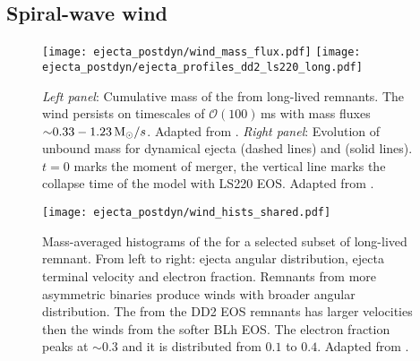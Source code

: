 \subsection{Spiral-wave wind} \label{sec:bns_sims:sww}

\begin{figure}[t]
    \centering 
    \texttt{[image: ejecta\_postdyn/wind\_mass\_flux.pdf]}
    \texttt{[image: ejecta\_postdyn/ejecta\_profiles\_dd2\_ls220\_long.pdf]}
    \caption{
        \emph{Left panel}:
        Cumulative mass of the \swind{} from long-lived
        remnants. The wind persists on timescales of $\mathcal{O}(100)\,$ms with
        mass fluxes ${\sim}0.33-1.23\,{\text{M}_{\odot}}/s$.
        Adapted from \citet{Nedora:2020pak}.
        \emph{Right panel}:
        Evolution of unbound mass for dynamical ejecta
        (dashed lines)
        and \swind{}
        (solid lines). $t=0$ marks the moment of merger, the vertical
        line marks the collapse time of the model with LS220 \ac{EOS}.
        Adapted from \citet{Nedora:2019jhl}.
    }
    \label{fig:mej:bern}
\end{figure}


\begin{figure*}[t]
    \centering 
    \texttt{[image: ejecta\_postdyn/wind\_hists\_shared.pdf]}
    \caption{Mass-averaged histograms of the \swind{} for a selected
        subset of long-lived remnant. From left to right: ejecta angular
        distribution, ejecta terminal velocity and electron
        fraction. Remnants from more asymmetric binaries produce winds
        with broader angular distribution.
        The \swind{} from the DD2 EOS remnants has larger velocities
        then the winds from the softer BLh EOS. The electron fraction
        peaks at ${\sim}0.3$ and it is distributed from $0.1$ to $0.4$.
        Adapted from \citet{Nedora:2020pak}.
    }
    \label{fig:ejecta:bern:hist}
\end{figure*}

